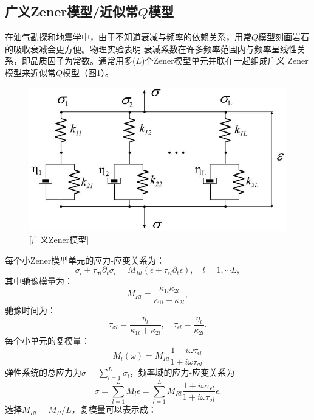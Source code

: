 \vspace{0.9cm}
\subsection{广义Zener模型/近似常$Q$模型}
\vspace{0.1cm}
在油气勘探和地震学中，由于不知道衰减与频率的依赖关系，用常$Q$模型刻画岩石的吸收衰减会更方便。物理实验表明
衰减系数在许多频率范围内与频率呈线性关系，即品质因子为常数。通常用多($L$)个Zener模型单元并联在一起组成广义
Zener模型来近似常$Q$模型（图\ref{fig:zener}）。
\begin{figure}[!htbp]
	    \centering
		\includegraphics[width=0.7\linewidth]{figure/zener}
	    [广义Zener模型]
		\label{fig:zener}
\end{figure}
每个小Zener模型单元的应力-应变关系为：
\begin{equation}
	\sigma_l+\tau_{\sigma l}\partial_t\sigma_l=M_{Rl}(\epsilon+\tau_{\epsilon l}
	\partial_t\epsilon), \quad l=1,\cdots L,
\end{equation}
其中驰豫模量为：
\begin{equation}
	M_{Rl}=\frac{\kappa_{1l}\kappa_{2l}}{\kappa_{1l}+\kappa_{2l}},
\end{equation}
驰豫时间为：
\begin{equation}
	\tau_{\sigma l}=\frac{\eta_l}{\kappa_{1l}+\kappa_{2l}}, \quad \tau_{\epsilon l}=
	\frac{\eta_l}{\kappa_{2l}}.
\end{equation}
每个小单元的复模量：
\begin{equation}
	M_l(\omega)=M_{Rl}\frac{1+i\omega\tau_{\epsilon l}}{1+i\omega\tau_{\sigma l}}
\end{equation}
弹性系统的总应力为$\sigma=\sum_{l=1}^{L}\sigma_l$，频率域的应力-应变关系为
\begin{equation}
	\sigma=\sum_{l=1}^{L}M_l\epsilon=\sum_{l=1}^{L}M_{Rl}\frac{1+i\omega\tau_{\epsilon l}}
	{1+i\omega\tau_{\sigma l}}\epsilon.
\end{equation}
选择$M_{Rl}=M_R/L$，复模量可以表示成：
